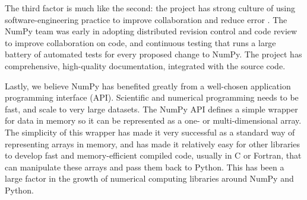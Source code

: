 The third factor is much like the second: 
the project has strong culture of using software-engineering practice to
improve collaboration and reduce error \cite{millman2014developing}.
The NumPy team was early in adopting distributed
revision control and code review to improve collaboration on code, and
continuous testing that runs a large battery of automated tests for every proposed
change to NumPy.
The project has comprehensive, high-quality documentation,
integrated with the source
code\cite{vanderwalt2008scipy,harrington2008scipy,harrington2009scipy}. 

Lastly, we believe NumPy has benefited greatly from a well-chosen application
programming interface (API).  Scientific and numerical programming needs to be
fast, and scale to very large datasets.  The NumPy API defines a simple wrapper
for data in memory so it can be represented as a one- or multi-dimensional
array.  The simplicity of this wrapper has made it very successful as a
standard way of representing arrays in memory, and has made it relatively easy
for other libraries to develop fast and memory-efficient compiled code, usually
in C or Fortran, that can manipulate these arrays and pass them back to Python.
This has been a large factor in the growth of numerical computing libraries
around NumPy and Python.


%
%
%
%
%
%

